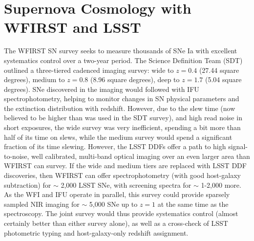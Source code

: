 %
%

\section{Supernova Cosmology with WFIRST and LSST}
\def\secname{\chpname:supernovae}\label{sec:\secname}


%

The WFIRST SN survey seeks to measure thousands of SNe Ia with excellent systematics control over a two-year period. The Science Definition Team (SDT) outlined a three-tiered cadenced imaging survey: wide to $z=0.4$ (27.44 square degrees), medium to $z=0.8$ (8.96 square degrees), deep to $z=1.7$ (5.04 square degrees). SNe discovered in the imaging would followed with IFU spectrophotometry, helping to monitor changes in SN physical parameters and the extinction distribution with redshift. However, due to the slew time (now believed to be higher than was used in the SDT survey), and high read noise in short exposures, the wide survey was very inefficient, spending a bit more than half of its time on slews, while the medium survey would spend a significant fraction of its time slewing. However, the LSST DDFs offer a path to high signal-to-noise, well calibrated, multi-band optical imaging over an even larger area than WFIRST can survey. If the wide and medium tiers are replaced with LSST DDF discoveries, then WFIRST can offer spectrophotometry (with good host-galaxy subtraction) for $\sim$ 2,000 LSST SNe, with screening spectra for $\sim$ 1-2,000 more. As the WFI and IFU operate in parallel, this survey could provide sparsely sampled NIR imaging for $\sim$ 5,000 SNe up to $z = 1$ at the same time as the spectroscopy. The joint survey would thus provide systematics control (almost certainly better than either survey alone), as well as a cross-check of LSST photometric typing and host-galaxy-only redshift assignment.


